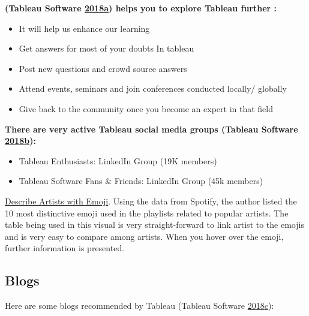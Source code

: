 \documentclass[]{book}
\providecommand{\tightlist}{%
  \setlength{\itemsep}{0pt}\setlength{\parskip}{0pt}}
\begin{document}
\textbf{(Tableau Software \protect\hyperlink{ref-Tableau_Community}{2018}\protect\hyperlink{ref-Tableau_Community}{a}) helps you to explore Tableau further :}

\begin{itemize}
\tightlist
\item
  It will help us enhance our learning
\item
  Get answers for most of your doubts In tableau
\item
  Post new questions and crowd source answers
\item
  Attend events, seminars and join conferences conducted locally/ globally
\item
  Give back to the community once you become an expert in that field
\end{itemize}

\textbf{There are very active Tableau social media groups (Tableau Software \protect\hyperlink{ref-LinkedIn_Groups}{2018}\protect\hyperlink{ref-LinkedIn_Groups}{b}):}

\begin{itemize}
\tightlist
\item
  Tableau Enthusiasts: LinkedIn Group (19K members)
\item
  Tableau Software Fans \& Friends: LinkedIn Group (45k members)
\end{itemize}

\href{https://public.tableau.com/en-us/s/gallery/what-emoji-say-about-music?gallery=featured}{Describe Artists with Emoji}. Using the data from Spotify, the author listed the 10 most distinctive emoji used in the playlists related to popular artists. The table being used in this visual is very straight-forward to link artist to the emojis and is very easy to compare among artists. When you hover over the emoji, further information is presented.

\hypertarget{blogs-1}{%
\subsection{Blogs}\label{blogs-1}}

Here are some blogs recommended by Tableau (Tableau Software \protect\hyperlink{ref-Top_10_Blogs}{2018}\protect\hyperlink{ref-Top_10_Blogs}{c}):
\end{document}

